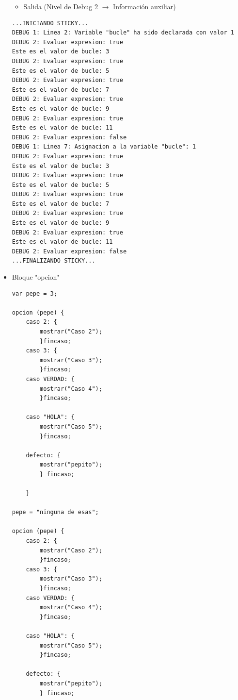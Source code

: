 \documentclass[a4paper, 12pt]{book}
\begin{document}
\begin{itemize}
  \begin{itemize}
  \item Salida (Nivel de Debug 2 $\rightarrow$ Información auxiliar)
  \end{itemize}
\begin{verbatim}
...INICIANDO STICKY...
DEBUG 1: Linea 2: Variable "bucle" ha sido declarada con valor 1
DEBUG 2: Evaluar expresion: true
Este es el valor de bucle: 3
DEBUG 2: Evaluar expresion: true
Este es el valor de bucle: 5
DEBUG 2: Evaluar expresion: true
Este es el valor de bucle: 7
DEBUG 2: Evaluar expresion: true
Este es el valor de bucle: 9
DEBUG 2: Evaluar expresion: true
Este es el valor de bucle: 11
DEBUG 2: Evaluar expresion: false
DEBUG 1: Linea 7: Asignacion a la variable "bucle": 1
DEBUG 2: Evaluar expresion: true
Este es el valor de bucle: 3
DEBUG 2: Evaluar expresion: true
Este es el valor de bucle: 5
DEBUG 2: Evaluar expresion: true
Este es el valor de bucle: 7
DEBUG 2: Evaluar expresion: true
Este es el valor de bucle: 9
DEBUG 2: Evaluar expresion: true
Este es el valor de bucle: 11
DEBUG 2: Evaluar expresion: false
...FINALIZANDO STICKY...
\end{verbatim}
  
  
  
  
\item Bloque "opcion"\\
  

  
\begin{verbatim}
var pepe = 3;

opcion (pepe) {
    caso 2: {
        mostrar("Caso 2");
        }fincaso;
    caso 3: {
        mostrar("Caso 3");
        }fincaso;
    caso VERDAD: {
        mostrar("Caso 4");
        }fincaso;
    
    caso "HOLA": {
        mostrar("Caso 5");
        }fincaso;
    
    defecto: {
        mostrar("pepito");
        } fincaso;
    
    }

pepe = "ninguna de esas";

opcion (pepe) {
    caso 2: {
        mostrar("Caso 2");
        }fincaso;
    caso 3: {
        mostrar("Caso 3");
        }fincaso;
    caso VERDAD: {
        mostrar("Caso 4");
        }fincaso;
    
    caso "HOLA": {
        mostrar("Caso 5");
        }fincaso;
    
    defecto: {
        mostrar("pepito");
        } fincaso;
    

\end{verbatim}
\end{itemize}
\end{document}

